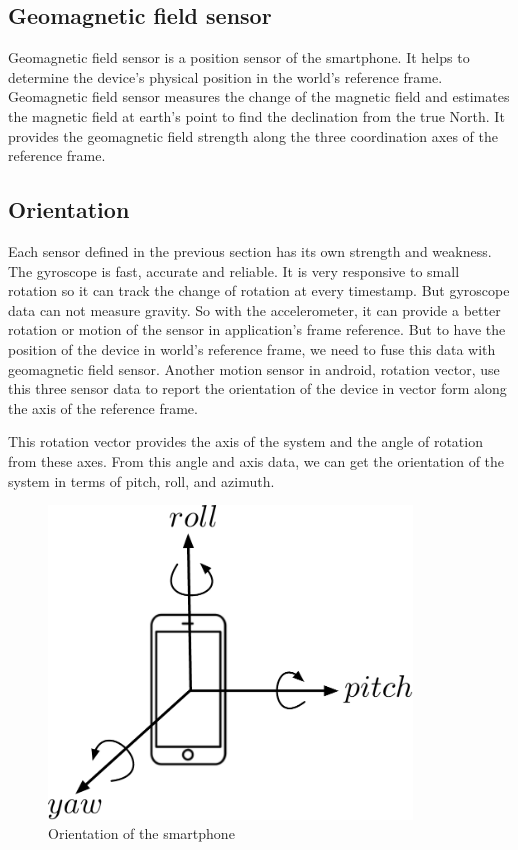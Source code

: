 \subsection{Geomagnetic field sensor}
Geomagnetic field sensor is a position sensor of the smartphone.
It helps to determine the device's physical position in the world's reference frame.
Geomagnetic field sensor measures the change of the magnetic field and estimates the magnetic field at earth's point to find the declination from the true North.
It provides the geomagnetic field strength along the three coordination axes of the reference frame.


\subsection{Orientation}
Each sensor defined in the previous section has its own strength and weakness.
The gyroscope is fast, accurate and reliable.
It is very responsive to small rotation so it can track the change of rotation at every timestamp.
But gyroscope data can not measure gravity.
So with the accelerometer, it can provide a better rotation or motion of the sensor in application's frame reference.
But to have the position of the device in world's reference frame, we need to fuse this data with geomagnetic field sensor.
Another motion sensor in android, rotation vector, use this three sensor data to report the orientation of the device in vector form along the axis of the reference frame.

This rotation vector provides the axis of the system and the angle of rotation from these axes.
From this angle and axis data, we can get the orientation of the system in terms of pitch, roll, and azimuth.

\begin{figure}
\centering
\includegraphics[width=3.8in]{figures/roll_pitch_yaw.pdf}
\caption{Orientation of the smartphone}
\label{f:rpy_dia}
\end{figure}

